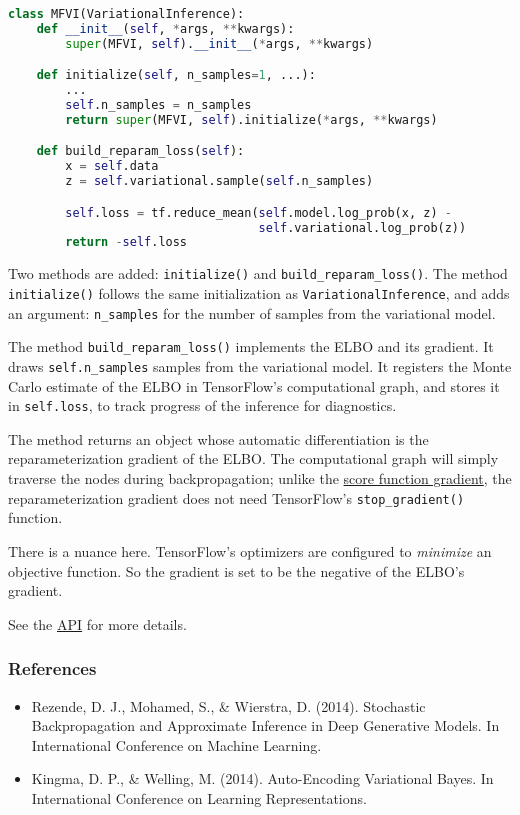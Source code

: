 \begin{lstlisting}[language=Python]
class MFVI(VariationalInference):
    def __init__(self, *args, **kwargs):
        super(MFVI, self).__init__(*args, **kwargs)

    def initialize(self, n_samples=1, ...):
        ...
        self.n_samples = n_samples
        return super(MFVI, self).initialize(*args, **kwargs)

    def build_reparam_loss(self):
        x = self.data
        z = self.variational.sample(self.n_samples)

        self.loss = tf.reduce_mean(self.model.log_prob(x, z) -
                                   self.variational.log_prob(z))
        return -self.loss
\end{lstlisting}

Two methods are added: \texttt{initialize()} and
\texttt{build_reparam_loss()}. The method \texttt{initialize()}
follows the same initialization as \texttt{VariationalInference}, and
adds an argument: \texttt{n_samples} for the number of samples from
the variational model.

The method \texttt{build_reparam_loss()} implements the ELBO and its
gradient. It draws \texttt{self.n_samples} samples from the
variational model. It registers the Monte Carlo
estimate of the ELBO in TensorFlow's computational graph, and stores it
in \texttt{self.loss}, to track progress of the inference for diagnostics.

The method returns an object whose automatic differentiation is the
reparameterization gradient of the ELBO. The computational graph will
simply traverse the nodes during backpropagation; unlike the
\href{tut_KLqp_score}{score function gradient}, the
reparameterization gradient does not need TensorFlow's
\texttt{stop_gradient()} function.

There is a nuance here. TensorFlow's optimizers are configured to
\emph{minimize} an objective function. So the gradient is set to be
the negative of the ELBO's gradient.

See the \href{api/}{API} for more details.

\subsubsection{References}\label{references}

\begin{itemize}
\item
  Rezende, D. J., Mohamed, S., & Wierstra, D. (2014). Stochastic
  Backpropagation and Approximate Inference in Deep Generative Models.
  In International Conference on Machine Learning.
\item
  Kingma, D. P., & Welling, M. (2014). Auto-Encoding Variational
  Bayes. In International Conference on Learning Representations.
\end{itemize}
